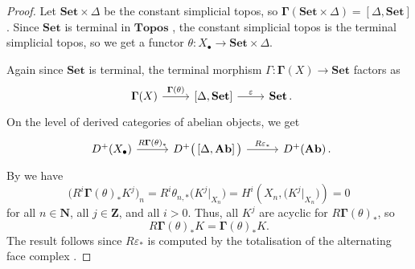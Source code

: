 \documentclass[11pt]{amsart}
\theoremstyle{definition}
\newcommand{\Ab}{\mathbf{Ab}}
\newcommand{\Set}{\mathbf{Set}}
\newcommand{\Topos}{\mathbf{Topos}}
\newcommand{\punct}[1]{\makebox[0pt][l]{\,#1}} %
\begin{document}
\begin{proof}
Let $\Set \times \Delta$ be the constant simplicial topos, so
$\mathbf \Gamma(\Set \times \Delta) = [\Delta,\Set]$. Since $\Set$
is terminal in $\Topos$ \cite[exp.~IV,~\S4.3]{SGA4I}, the constant
simplicial topos is the terminal simplicial topos, so we get a
functor $\theta \colon X_\bullet \to \Set \times \Delta$.

Again since $\Set$ is terminal, the terminal morphism $\Gamma \colon
\mathbf \Gamma(X) \to \Set$ factors as
\begin{equation*}
\begin{tikzcd}
\mathbf \Gamma(X) \ar{r}{\mathbf \Gamma(\theta)} &
\left[\Delta,\Set\right] \ar{r}{\varepsilon} & \Set\punct{.}
\end{tikzcd}
\end{equation*}
On the level of derived categories of abelian objects, we get
\begin{equation*}
\begin{tikzcd}[column sep=2.8em]
D^+(X_\bullet) \ar{r}{R\mathbf \Gamma(\theta)_*} &
D^+\big(\left[\Delta,\Ab\right]\big) \ar{r}{R\varepsilon_*} &
D^+(\Ab)\punct{.}
\end{tikzcd}
\end{equation*}
By \cite[exp.~V$^{\text{bis}}$,~prop.~1.3.7~and~cor.~1.3.12]{SGA4II}
we have
\[
\Big(R^i\mathbf \Gamma(\theta)_* K^j\Big)_n =
R^i\theta_{n,*}\big(K^j\big|_{X_n}\big) =
H^i\left(X_n,\big(K^j\big|_{X_n}\big)\right) = 0
\]
for all $n \in \mathbf N$, all $j \in \mathbf Z$, and all $i > 0$.
Thus, all $K^j$ are acyclic for $R\mathbf \Gamma(\theta)_*$, so
\[
R\mathbf \Gamma(\theta)_* K = \mathbf \Gamma(\theta)_* K.
\]
The result follows since $R\varepsilon_*$ is computed by the
totalisation of the alternating face complex
\cite[exp.~V$^{\text{bis}}$,~cor.~2.3.6]{SGA4II}.
\end{proof}
\end{document}
